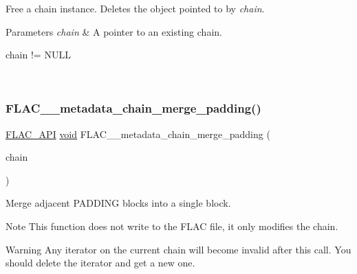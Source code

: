 Free a chain instance. Deletes the object pointed to by {\itshape chain}.


\begin{DoxyParams}{Parameters}
{\em chain} & A pointer to an existing chain.  
\begin{DoxyCode}
chain != NULL 
\end{DoxyCode}
 \\
\hline
\end{DoxyParams}
\mbox{\label{group__flac__metadata__level2_gab24934bc1f0e054c631a22c9b9221f3e}} 
\subsubsection{\texorpdfstring{F\+L\+A\+C\+\_\+\+\_\+metadata\+\_\+chain\+\_\+merge\+\_\+padding()}{FLAC\_\_metadata\_chain\_merge\_padding()}}
{\footnotesize\ttfamily \hyperlink{group__flac__export_ga56ca07df8a23310707732b1c0007d6f5}{F\+L\+A\+C\+\_\+\+A\+PI} \hyperlink{png_8h_ac9c84fa68bbad002983e35ce3663c686}{void} F\+L\+A\+C\+\_\+\+\_\+metadata\+\_\+chain\+\_\+merge\+\_\+padding (\begin{DoxyParamCaption}\item[{\hyperlink{group__flac__metadata__level2_gaec6993c60b88f222a52af86f8f47bfdf}{F\+L\+A\+C\+\_\+\+\_\+\+Metadata\+\_\+\+Chain} $\ast$}]{chain }\end{DoxyParamCaption})}

Merge adjacent P\+A\+D\+D\+I\+NG blocks into a single block.

\begin{DoxyNote}{Note}
This function does not write to the F\+L\+AC file, it only modifies the chain.
\end{DoxyNote}
\begin{DoxyWarning}{Warning}
Any iterator on the current chain will become invalid after this call. You should delete the iterator and get a new one.
\end{DoxyWarning}

